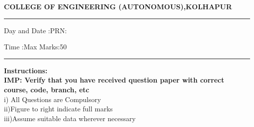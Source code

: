 \documentclass[12pt]{article}
\begin{document}
	\par
	{\bf{COLLEGE OF ENGINEERING (AUTONOMOUS),KOLHAPUR}}
	\par\noindent\rule{\textwidth}{0.4pt}
	
	\par
	\par
	\par
	\begin{flushleft}
		Day and Date :{}\hspace{5.5cm}PRN:
	\end{flushleft}
	
	\begin{flushleft}
		Time :{}\hspace{7cm}Max Marks:{50}\\
	\end{flushleft}
	\noindent\rule{\textwidth}{0.1pt}
\begin{flushleft}
	{\bf Instructions:}\\
	{\hspace{0.5cm} \bf IMP: Verify that you have received question paper with correct course, code, branch, etc}\\
	\hspace{1cm}i) All Questions are Compulsory\\
	\hspace{1cm}ii)Figure to right indicate full marks\\
	\hspace{1cm}iii)Assume suitable data wherever necessary\\
\end{flushleft}
\end{document}

